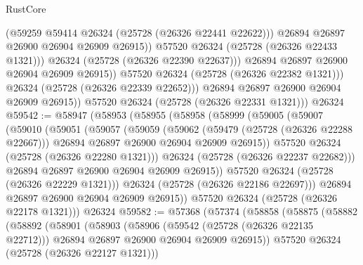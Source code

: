 \begin{lexlean}{RustCore}
\begin{coremodule}
                          (@59259 @59414 @26324 (@25728 (@26326 @22441 @22622)))
                          @26894
                          @26897
                          @26900
                          @26904
                          @26909
                          @26915))
                      @57520
                      @26324
                      (@25728 (@26326 @22433 @1321)))
                    @26324
                    (@25728 (@26326 @22390 @22637)))
                  @26894
                  @26897
                  @26900
                  @26904
                  @26909
                  @26915))
              @57520
              @26324
              (@25728 (@26326 @22382 @1321)))
            @26324
            (@25728 (@26326 @22339 @22652)))
          @26894
          @26897
          @26900
          @26904
          @26909
          @26915))
      @57520
      @26324
      (@25728 (@26326 @22331 @1321)))
    @26324
@59542 := @58947
    (@58953
      (@58955
        (@58958
          (@58999
            (@59005
              (@59007
                (@59010
                  (@59051
                    (@59057
                      (@59059
                        (@59062
                          (@59479 (@25728 (@26326 @22288 @22667)))
                          @26894
                          @26897
                          @26900
                          @26904
                          @26909
                          @26915))
                      @57520
                      @26324
                      (@25728 (@26326 @22280 @1321)))
                    @26324
                    (@25728 (@26326 @22237 @22682)))
                  @26894
                  @26897
                  @26900
                  @26904
                  @26909
                  @26915))
              @57520
              @26324
              (@25728 (@26326 @22229 @1321)))
            @26324
            (@25728 (@26326 @22186 @22697)))
          @26894
          @26897
          @26900
          @26904
          @26909
          @26915))
      @57520
      @26324
      (@25728 (@26326 @22178 @1321)))
    @26324
@59582 := @57368
    (@57374
      (@58858
        (@58875
          (@58882
            (@58892
              (@58901
                (@58903
                  (@58906
                    (@59542 (@25728 (@26326 @22135 @22712)))
                    @26894
                    @26897
                    @26900
                    @26904
                    @26909
                    @26915))
                @57520
                @26324
                (@25728 (@26326 @22127 @1321)))

\end{coremodule}
\end{lexlean}
